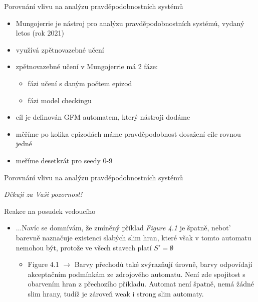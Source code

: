 \documentclass[
]{beamer}
\begin{document}
	
\begin{frame}{Porovnání vlivu na analýzu pravděpodobnostních systémů}
	\begin{itemize}
		\pause
		\item \alert{Mungojerrie} je nástroj pro analýzu pravděpodobnostních systémů, vydaný letos (rok 2021)\pause
		\item využívá zpětnovazebné učení\pause
		\item zpětnovazebné učení v Mungojerrie má 2 fáze:\pause
		\begin{itemize}
			\item fázi učení s daným počtem epizod
			\item fázi model checkingu
		\end{itemize}\pause
		\item \alert{cíl je definován GFM automatem}, který nástroji dodáme\pause
		\item měříme po kolika epizodách máme pravděpodobnost dosažení cíle rovnou jedné\pause
		\item meříme desetkrát pro seedy 0-9
	\end{itemize}
		
\end{frame}
\begin{frame}{Porovnání vlivu na analýzu pravděpodobnostních systémů}
	
	\pause
	\begin{flushright}\emph{Děkuji za Vaši pozornost!}\end{flushright}

\end{frame}



\appendix




	\begin{frame}{Reakce na posudek vedoucího}
		\begin{itemize}
		\item $\ldots$Navíc se domnívám, že zmíněný příklad \emph{Figure 4.1} je špatně, nebot’ barevně naznačuje existenci slabých slim hran, které však v tomto automatu nemohou být, protože ve všech stavech platí $S'= \emptyset$
		\begin{itemize}
		\item Figure 4.1 $\rightarrow$
		Barvy přechodů také zvýrazňují úrovně, barvy odpovídají akceptačním podmínkám ze zdrojového automatu. Není zde spojitost s obarvením hran z přechozího příkladu. Automat není špatně, nemá žádné slim hrany, tudíž je zároveň weak i strong slim automaty.
		\end{itemize}
	\end{itemize}

		
		
	\end{frame}
	
\end{document}
